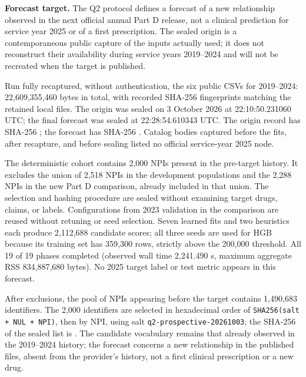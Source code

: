 \textbf{Forecast target.} The Q2 protocol defines a forecast of a new relationship observed in the next official annual Part D release, not a clinical prediction for service year 2025 or of a first prescription. The sealed origin is a contemporaneous public capture of the inputs actually used; it does not reconstruct their availability during service years 2019--2024 and will not be recreated when the target is published\cite{hgbq2forecast}.

Run  fully recaptured, without authentication, the six public CSVs for 2019--2024: 22,609,355,460 bytes in total, with recorded SHA-256 fingerprints matching the retained local files. The origin was sealed on 3 October 2026 at 22:10:50.231060 UTC; the final forecast was sealed at 22:28:54.610343 UTC. The origin record has SHA-256 ; the forecast has SHA-256 . Catalog bodies captured before the fits, after recapture, and before sealing listed no official service-year 2025 node.

The deterministic cohort contains 2,000 NPIs present in the pre-target history. It excludes the union of 2,518 NPIs in the development populations and the 2,288 NPIs in the new Part D comparison, already included in that union. The selection and hashing procedure are sealed without examining target drugs, claims, or labels. Configurations from 2023 validation in the comparison are reused without retuning or seed selection. Seven learned fits and two heuristics each produce 2,112,688 candidate scores; all three seeds are used for HGB because its training set has 359,300 rows, strictly above the 200,000 threshold. All 19 of 19 phases completed (observed wall time 2,241.490 s, maximum aggregate RSS 834,887,680 bytes). No 2025 target label or test metric appears in this forecast.

After exclusions, the pool of NPIs appearing before the target contains 1,490,683 identifiers.
The 2,000 identifiers are selected in hexadecimal order of \texttt{SHA256(salt + NUL + NPI)}, then by NPI, using salt \texttt{q2-prospective-20261003}; the SHA-256 of the sealed list is .
The candidate vocabulary remains that already observed in the 2019--2024 history; the forecast concerns a new relationship in the published files, absent from the provider's history, not a first clinical prescription or a new drug.

